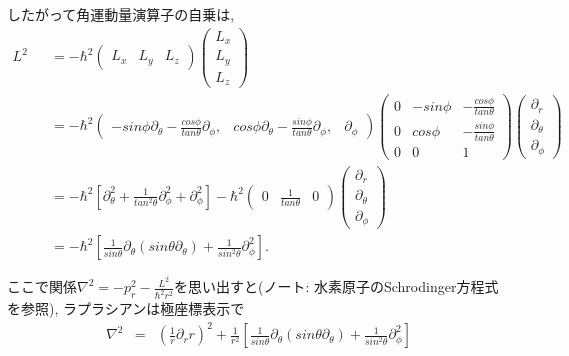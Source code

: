\documentclass[11pt,a4paper]{jsarticle}
\begin{document}
したがって角運動量演算子の自乗は, 
\begin{eqnarray}
L^2 &&= -\hbar^2 \left(\begin{array}{ccc} L_x & L_y & L_z \end{array} \right) \left( \begin{array}{c} L_x \\ L_y \\ L_z \end{array} \right) \nonumber \nonumber \\
&&= -\hbar^2 \left(\begin{array}{ccc} -sin\phi\partial_\theta - \frac{cos\phi}{tan\theta } \partial_\phi, & cos\phi \partial_\theta - \frac{sin\phi}{tan\theta }\partial_\phi, & \partial_\phi \end{array} \right) \left(\begin{array}{ccc} 0 & -sin\phi &- \frac{cos\phi}{tan\theta } \\ 0 & cos\phi & - \frac{sin\phi}{tan\theta }\\ 0 & 0& 1 \end{array} \right) \left( \begin{array}{c} \partial_r \\ \partial_\theta \\ \partial_\phi \end{array} \right) \nonumber \\
&&= -\hbar^2 [ \partial_\theta^2 + \frac{1}{tan^2\theta } \partial_\phi^2 +  \partial_\phi^2 ]  -\hbar^2 \left(\begin{array}{ccc} 0 & \frac{1}{tan\theta } & 0 \end{array} \right) \left( \begin{array}{c} \partial_r \\ \partial_\theta \\ \partial_\phi \end{array} \right)\nonumber \\
&&= -\hbar^2 [  \frac{1}{sin\theta }\partial_\theta  ( sin\theta  \partial_\theta) + \frac{1}{sin^2\theta } \partial_\phi^2  ]. 
\end{eqnarray}

ここで関係$\nabla^2 = - p_r^2 - \frac{L^2}{\hbar^2 r^2}$を思い出すと(ノート: 水素原子のSchrodinger方程式を参照), ラプラシアンは極座標表示で
\begin{eqnarray}
\nabla^2 &= & (\frac{1}{r} \partial_r r)^2  + \frac{1}{r^2}[  \frac{1}{sin\theta }\partial_\theta  ( sin\theta  \partial_\theta) + \frac{1}{sin^2\theta } \partial_\phi^2  ]
\end{eqnarray}
\end{document}
